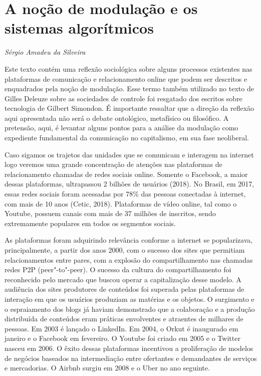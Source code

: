 \chapter{A noção de modulação e os sistemas algorítmicos}

\begin{flushright}
\emph{Sérgio Amadeu da Silveira}
\end{flushright}

Este texto contém uma reflexão sociológica sobre alguns processos
existentes nas plataformas de comunicação e relacionamento online que
podem ser descritos e enquadrados pela noção de modulação. Esse termo
também utilizado no texto de Gilles Deleuze sobre as sociedades de
controle foi resgatado dos escritos sobre tecnologia de Gilbert
Simondon. É importante ressaltar que a direção da reflexão aqui
apresentada não será o debate ontológico, metafísico ou filosófico. A
pretensão, aqui, é levantar alguns pontos para a análise da modulação
como expediente fundamental da comunicação no capitalismo, em sua fase
neoliberal.

Caso sigamos os trajetos das unidades que se comunicam e interagem na
internet logo veremos uma grande concentração de atenções nas
plataformas de relacionamento chamadas de redes sociais online. Somente
o Facebook, a maior dessas plataformas, ultrapassou 2 bilhões de
usuários (2018). No Brasil, em 2017, essas redes sociais foram acessadas
por 78\% das pessoas conectadas à internet, com mais de 10 anos (Cetic,
2018). Plataformas de vídeo online, tal como o Youtube, possuem canais
com mais de 37 milhões de inscritos, sendo extremamente populares em
todos os segmentos sociais.

As plataformas foram adquirindo relevância conforme a internet se
popularizava, principalmente, a partir dos anos 2000, com o sucesso dos
sites que permitiam relacionamentos entre pares, com a explosão do
compartilhamento nas chamadas redes P2P (peer"-to"-peer). O sucesso da
cultura do compartilhamento foi reconhecido pelo mercado que buscou
operar a capitalização desse modelo. A audiência dos sites produtores de
conteúdos foi superada pelas plataformas de interação em que os usuários
produziam as matérias e os objetos. O surgimento e o espraiamento dos
blogs já haviam demonstrado que a colaboração e a produção distribuída
de conteúdos eram práticas envolventes e atraentes de milhares de
pessoas. Em 2003 é lançado o LinkedIn. Em 2004, o Orkut é inaugurado em
janeiro e o Facebook em fevereiro. O Youtube foi criado em 2005 e o
Twitter nasceu em 2006. O êxito dessas plataformas incentivou a
proliferação de modelos de negócios baseados na intermediação entre
ofertantes e demandantes de serviços e mercadorias. O Airbnb surgiu em
2008 e o Uber no ano seguinte.

